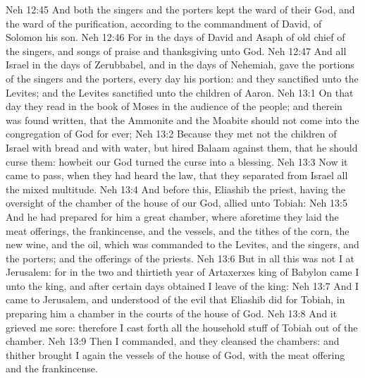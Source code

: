 \vs Neh 12:45 And both the singers and the porters kept the ward of their God, and the ward of the purification, according to the commandment of David,  of Solomon his son.
\vs Neh 12:46 For in the days of David and Asaph of old  chief of the singers, and songs of praise and thanksgiving unto God.
\vs Neh 12:47 And all Israel in the days of Zerubbabel, and in the days of Nehemiah, gave the portions of the singers and the porters, every day his portion: and they sanctified  unto the Levites; and the Levites sanctified  unto the children of Aaron.
\vs Neh 13:1 On that day they read in the book of Moses in the audience of the people; and therein was found written, that the Ammonite and the Moabite should not come into the congregation of God for ever;
\vs Neh 13:2 Because they met not the children of Israel with bread and with water, but hired Balaam against them, that he should curse them: howbeit our God turned the curse into a blessing.
\vs Neh 13:3 Now it came to pass, when they had heard the law, that they separated from Israel all the mixed multitude.
\vs Neh 13:4 And before this, Eliashib the priest, having the oversight of the chamber of the house of our God,  allied unto Tobiah:
\vs Neh 13:5 And he had prepared for him a great chamber, where aforetime they laid the meat offerings, the frankincense, and the vessels, and the tithes of the corn, the new wine, and the oil, which was commanded  to the Levites, and the singers, and the porters; and the offerings of the priests.
\vs Neh 13:6 But in all this  was not I at Jerusalem: for in the two and thirtieth year of Artaxerxes king of Babylon came I unto the king, and after certain days obtained I leave of the king:
\vs Neh 13:7 And I came to Jerusalem, and understood of the evil that Eliashib did for Tobiah, in preparing him a chamber in the courts of the house of God.
\vs Neh 13:8 And it grieved me sore: therefore I cast forth all the household stuff of Tobiah out of the chamber.
\vs Neh 13:9 Then I commanded, and they cleansed the chambers: and thither brought I again the vessels of the house of God, with the meat offering and the frankincense.
